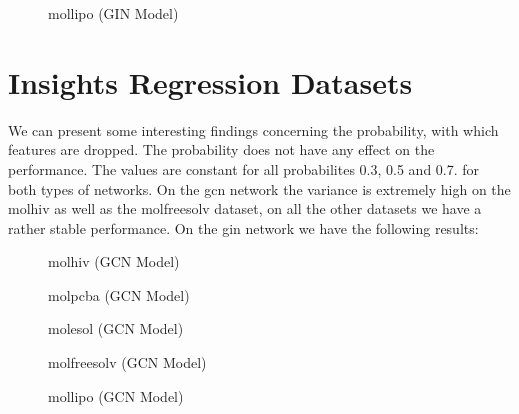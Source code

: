 \begin{figure}
    \centering
    \caption{mollipo (GIN Model)}
    \label{fig:gcn-molfreesolv}
\end{figure}
\section{Insights Regression Datasets}




We can present some interesting findings concerning the probability, with which features are dropped. The probability does not have any effect on the performance. The values are constant for all probabilites 0.3, 0.5 and 0.7. for both types of networks. On the \ac{gcn} network the variance is extremely high on the molhiv as well as the molfreesolv dataset, on all the other datasets we have a rather stable performance. On the \ac{gin} network we have the following results:



\begin{figure}
    \centering
    \caption{molhiv (GCN Model)}
    \label{fig:gcn-molfreesolv}
\end{figure}

\begin{figure}
    \centering
    \caption{molpcba (GCN Model)}
    \label{fig:gcn-molfreesolv}
\end{figure}

\begin{figure}
    \centering
    \caption{molesol (GCN Model)}
    \label{fig:gcn-molfreesolv}
\end{figure}

\begin{figure}
    \centering
    \caption{molfreesolv (GCN Model)}
    \label{fig:gcn-molfreesolv}
\end{figure}

\begin{figure}
    \centering
    \caption{mollipo (GCN Model)}
    \label{fig:gcn-molfreesolv}
\end{figure}

